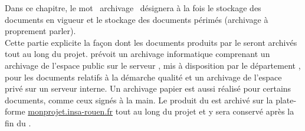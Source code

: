 Dans ce chapitre, le mot \og{}~archivage~\fg{} désignera à la fois le stockage des documents en vigueur et le stockage des documents périmés (archivage à proprement parler).\\

Cette partie explicite la façon dont les documents produits par le \PICCourt{}
 \nomEquipe{} seront archivés tout au long du projet. 
\nomEquipe{} prévoit un archivage informatique comprenant un archivage
de l'espace public sur le serveur \git{}, mis à disposition par le département \ASI{}, pour les documents relatifs à la démarche qualité et un archivage de l'espace privé sur un serveur interne. 
Un archivage papier est aussi réalisé pour certains documents, comme ceux signés à la main.
Le produit du \PICCourt{} est archivé sur la plate-forme \url{monprojet.insa-rouen.fr} tout au long du projet et y sera conservé après la fin du \PICCourt. \\



